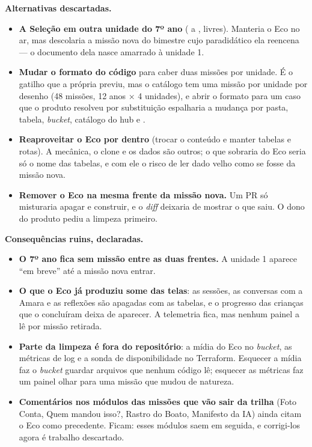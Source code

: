 \textbf{Alternativas descartadas.}

\begin{itemize}
  \item \textbf{A Seleção em outra unidade do 7º ano} ( a
    , livres). Manteria o Eco no ar, mas descolaria a missão nova
    do bimestre cujo paradidático ela reencena --- o documento dela nasce
    amarrado à unidade 1.
  \item \textbf{Mudar o formato do código} para caber duas missões por unidade.
    É o gatilho que a própria  previu, mas o catálogo tem uma
    missão por unidade por desenho (48 missões, 12 anos $\times$ 4 unidades), e
    abrir o formato para um caso que o produto resolveu por substituição
    espalharia a mudança por pasta, tabela, \emph{bucket}, catálogo do hub e
    .
  \item \textbf{Reaproveitar o Eco por dentro} (trocar o conteúdo e manter
    tabelas e rotas). A mecânica, o clone e os dados são outros; o que sobraria
    do Eco seria só o nome das tabelas, e com ele o risco de ler dado velho como
    se fosse da missão nova.
  \item \textbf{Remover o Eco na mesma frente da missão nova.} Um PR só
    misturaria apagar e construir, e o \emph{diff} deixaria de mostrar o que saiu.
    O dono do produto pediu a limpeza primeiro.
\end{itemize}

\textbf{Consequências ruins, declaradas.}

\begin{itemize}
  \item \textbf{O 7º ano fica sem missão entre as duas frentes.} A unidade 1
    aparece \enquote{em breve} até a missão nova entrar.
  \item \textbf{O que o Eco já produziu some das telas}: as sessões, as
    conversas com a Amara e as reflexões são apagadas com as tabelas, e o
    progresso das crianças que o concluíram deixa de aparecer. A telemetria
    fica, mas nenhum painel a lê por missão retirada.
  \item \textbf{Parte da limpeza é fora do repositório}: a mídia do Eco no
    \emph{bucket}, as métricas de log  e a sonda de
    disponibilidade no Terraform. Esquecer a mídia faz o \emph{bucket} guardar
    arquivos que nenhum código lê; esquecer as métricas faz um painel olhar para
    uma missão que mudou de natureza.
  \item \textbf{Comentários nos módulos das missões que vão sair da trilha}
    (Foto Conta, Quem mandou isso?, Rastro do Boato, Manifesto da IA) ainda
    citam o Eco como precedente. Ficam: esses módulos saem em seguida, e
    corrigi-los agora é trabalho descartado.
\end{itemize}

